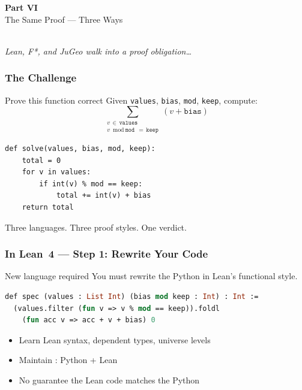 
\begin{frame}
\frametitle{}
\vfill
\begin{center}
  {\Huge\color{jugeoBlue}\textbf{Part VI}}\\[12pt]
  {\LARGE\color{jugeoDark}The Same Proof --- Three Ways}\\[20pt]
  \\[12pt]
  {\large\color{gray}\itshape Lean, F*, and JuGeo walk into a proof obligation\ldots}
\end{center}
\vfill
\end{frame}

\begin{frame}[fragile]
\frametitle{The Challenge}
\begin{block}{Prove this function correct}
Given \texttt{values}, \texttt{bias}, \texttt{mod}, \texttt{keep}, compute:
\[
  \sum_{\substack{v \,\in\, \texttt{values} \\ v \bmod \texttt{mod}\,=\,\texttt{keep}}}
  \!\!\!(v + \texttt{bias})
\]
\end{block}
\begin{lstlisting}
def solve(values, bias, mod, keep):
    total = 0
    for v in values:
        if int(v) % mod == keep:
            total += int(v) + bias
    return total
\end{lstlisting}
\medskip
\centering
{\large Three languages. Three proof styles. One verdict.}
\end{frame}

\begin{frame}[fragile]
\frametitle{In Lean~4 --- Step 1: Rewrite Your Code}
\begin{alertblock}{New language required}
You must rewrite the Python in Lean's functional style.
\end{alertblock}
\begin{lstlisting}[language=ML,morekeywords={def,where,List,Int,filter,foldl}]
def spec (values : List Int) (bias mod keep : Int) : Int :=
  (values.filter (fun v => v % mod == keep)).foldl
    (fun acc v => acc + v + bias) 0
\end{lstlisting}
\vfill
\begin{itemize}
  \item Learn Lean syntax, dependent types, universe levels
  \item Maintain : Python + Lean
  \item No guarantee the Lean code matches the Python
\end{itemize}
\end{frame}

